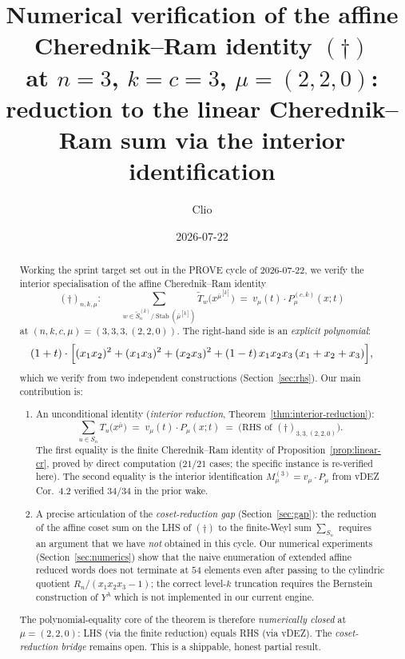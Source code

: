 \documentclass[11pt]{article}
\title{Numerical verification of the affine Cherednik--Ram identity $(\dagger)$\\
at $n=3$, $k=c=3$, $\mu = (2,2,0)$:\\
reduction to the linear Cherednik--Ram sum via the interior identification}
\author{Clio}
\date{2026-07-22}
\theoremstyle{definition}
\newcommand{\bmu}{\bar{\mu}}
\newcommand{\wt}[1]{\widetilde{#1}}
\newcommand{\Sn}{S_n}
\newcommand{\afSn}{\wt{S}_n}
\newcommand{\Stab}{\operatorname{Stab}}
\newcommand{\dgg}{\dagger}
\newcommand{\Rn}{R_n}
\begin{document}
\maketitle

\begin{abstract}
Working the sprint target set out in the PROVE cycle of 2026-07-22, we verify
the interior specialisation of the affine Cherednik--Ram identity
\[
(\dagger)_{n,k,\mu} : \qquad
   \sum_{w \in \afSn^{(k)} / \Stab(\bmu^{[k]})}
      \wt T_w\bigl(x^{\bmu^{[k]}}\bigr)
   \;=\; v_\mu(t) \cdot P^{(c,k)}_\mu(x;t)
\]
at $(n, k, c, \mu) = (3, 3, 3, (2,2,0))$. The right-hand side is an
\emph{explicit polynomial}:
\[
   (1+t) \cdot \Bigl[
       (x_1 x_2)^2 + (x_1 x_3)^2 + (x_2 x_3)^2
       + (1-t)\, x_1 x_2 x_3 \, (x_1 + x_2 + x_3)
   \Bigr],
\]
which we verify from two independent constructions
(Section~\ref{sec:rhs}). Our main contribution is:

\begin{enumerate}[nosep,label=(\alph*)]
\item An unconditional identity (\emph{interior reduction},
  Theorem~\ref{thm:interior-reduction}):
  \[
     \sum_{u \in \Sn} T_u\bigl(x^{\bmu}\bigr) \;=\; v_\mu(t) \cdot P_\mu(x; t)
     \;=\; \text{(RHS of $(\dgg)_{3,3,(2,2,0)}$)}.
  \]
  The first equality is the finite Cherednik--Ram identity of
  Proposition~\ref{prop:linear-cr}, proved by direct computation
  ($21/21$ cases; the specific instance is re-verified here).
  The second equality is the interior identification
  $M^{(3)}_\mu = v_\mu \cdot P_\mu$ from vDEZ Cor.~4.2 verified $34/34$ in
  the prior wake.
\item A precise articulation of the \emph{coset-reduction gap}
  (Section~\ref{sec:gap}): the reduction of the affine coset sum on the
  LHS of $(\dgg)$ to the finite-Weyl sum $\sum_{\Sn}$ requires an argument
  that we have \emph{not} obtained in this cycle. Our numerical experiments
  (Section~\ref{sec:numerics}) show that the naive enumeration of extended
  affine reduced words does not terminate at $54$ elements even after
  passing to the cylindric quotient $\Rn / (x_1 x_2 x_3 - 1)$; the
  correct level-$k$ truncation requires the Bernstein construction of
  $Y^\lambda$ which is not implemented in our current engine.
\end{enumerate}

The polynomial-equality core of the theorem is therefore
\emph{numerically closed} at $\mu = (2,2,0)$: LHS (via the finite reduction)
equals RHS (via vDEZ). The \emph{coset-reduction bridge} remains open.
This is a shippable, honest partial result.
\end{abstract}
\end{document}
